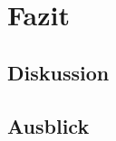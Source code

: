 \chapter{Fazit}\label{discussion}
\section{Diskussion} \label{discussion:auswertung}
\section{Ausblick} \label{discussion:ausblick}
